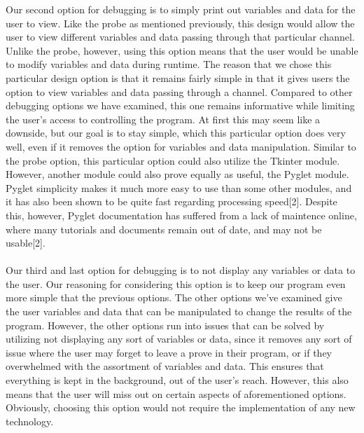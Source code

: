 \documentclass[journal,10pt,onecolumn,compsoc]{IEEEtran} \usepackage[margin=1.0in]{geometry} \usepackage{pdfpages} \usepackage{graphicx}
\begin{document}
\indent Our second option for debugging is to simply print out variables and data for the user to view. Like the probe as mentioned previously, this design would allow the user to view different variables and data passing through that particular channel. Unlike the probe, however, using this option means that the user would be unable to modify variables and data during runtime. The reason that we chose this particular design option is that it remains fairly simple in that it gives users the option to view variables and data passing through a channel. Compared to other debugging options we have examined, this one remains informative while limiting the user's access to controlling the program. At first this may seem like a downside, but our goal is to stay simple, which this particular option does very well, even if it removes the option for variables and data manipulation. Similar to the probe option, this particular option could also utilize the Tkinter module. However, another module could also prove equally as useful, the Pyglet module. Pyglet simplicity makes it much more easy to use than some other modules, and it has also been shown to be quite fast regarding processing speed[2]. Despite this, however, Pyglet documentation has suffered from a lack of maintence online, where many tutorials and documents remain out of date, and may not be usable[2].
\\ 
\\
\indent Our third and last option for debugging is to not display any variables or data to the user. Our reasoning for considering this option is to keep our program even more simple that the previous options. The other options we've examined give the user variables and data that can be manipulated to change the results of the program. However, the other options run into issues that can be solved by utilizing not displaying any sort of variables or data, since it removes any sort of issue where the user may forget to leave a prove in their program, or if they overwhelmed with the assortment of variables and data. This ensures that everything is kept in the background, out of the user's reach. However, this also means that the user will miss out on certain aspects of aforementioned options. Obviously, choosing this option would not require the implementation of any new technology.
\\
\end{document}
